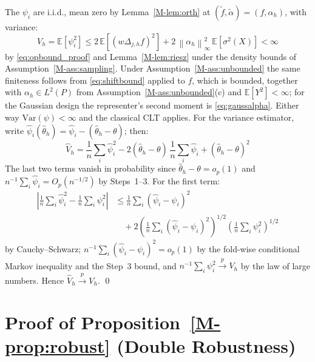 \documentclass[12pt,a4paper]{article}
\numberwithin{equation}{section}
\theoremstyle{plain}
\theoremstyle{definition}
\newcommand{\norm}[1]{\left\| #1 \right\|}
\newcommand{\E}{\mathbb{E}}
\newcommand{\xrightarrowp}{\xrightarrow{p}}
\newcommand{\abs}[1]{\left| #1 \right|}
\newcommand{\Dh}{\Delta_{j,h}}
\begin{document}
	The $\psi_i$ are i.i.d., mean zero by Lemma~\ref{M-lem:orth} at
	$(\tilde{f}, \tilde{\alpha}) = (f, \alpha_h)$, with variance:
	\begin{equation}
		V_h = \E[\psi_i^2]
		\leq 2\,\E\left[(w \Dh f)^2\right] + 2\,\norm{\alpha_h}_\infty^2\,
		\E[\sigma^2(X)] < \infty
	\end{equation}
	by \eqref{eq:opbound_proof} and Lemma~\ref{M-lem:riesz} under the density bounds of
	Assumption~\ref{M-ass:sampling}. Under Assumption~\ref{M-ass:unbounded} the same
	finiteness follows from \eqref{eq:shiftbound} applied to $f$, which is bounded,
	together with $\alpha_h \in L^2(P)$ from
	Assumption~\ref{M-ass:unbounded}(c) and $\E[Y^2] < \infty$; for the Gaussian design
	the representer's second moment is \eqref{eq:gaussalpha}. Either way
	$\mathrm{Var}(\psi) < \infty$ and the classical CLT applies. For the variance estimator, write
	$\hat{\psi}_i(\hat{\theta}_h) = \hat{\psi}_i - (\hat{\theta}_h - \theta)$; then:
	\begin{equation}
		\hat{V}_h = \frac{1}{n} \sum_i \hat{\psi}_i^2
		- 2(\hat{\theta}_h - \theta)\,\frac{1}{n}\sum_i \hat{\psi}_i
		+ (\hat{\theta}_h - \theta)^2
	\end{equation}
	The last two terms vanish in probability since
	$\hat{\theta}_h - \theta = o_p(1)$ and
	$n^{-1}\sum_i \hat{\psi}_i = O_p(n^{-1/2})$ by Steps~1--3. For the first term:
	\begin{equation}
		\begin{split}
			\abs{\frac{1}{n}\sum_i \hat{\psi}_i^2 - \frac{1}{n}\sum_i \psi_i^2}
			&\leq \frac{1}{n}\sum_i (\hat{\psi}_i - \psi_i)^2 \\
			&\quad + 2\left(\frac{1}{n}\sum_i (\hat{\psi}_i - \psi_i)^2\right)^{1/2}
			\left(\frac{1}{n}\sum_i \psi_i^2\right)^{1/2}
		\end{split}
	\end{equation}
	by Cauchy--Schwarz; $n^{-1}\sum_i (\hat{\psi}_i - \psi_i)^2 = o_p(1)$ by the
	fold-wise conditional Markov inequality and the Step~3 bound, and
	$n^{-1}\sum_i \psi_i^2 \xrightarrowp V_h$ by the law of large numbers. Hence
	$\hat{V}_h \xrightarrowp V_h$.
	\qed
	
	\section{Proof of Proposition~\ref{M-prop:robust} (Double Robustness)}
	\label{app:prop_robust}
	
\end{document}
